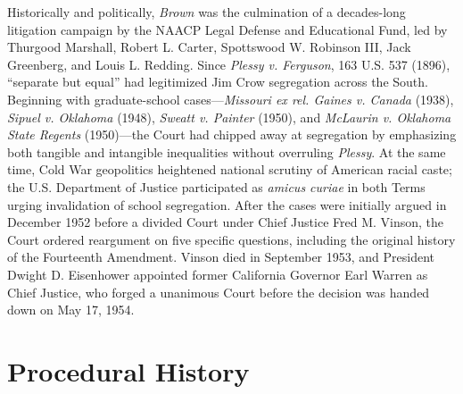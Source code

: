 \documentclass[12pt]{article}
\begin{document}
Historically and politically, \textit{Brown} was the culmination of a decades-long litigation campaign by the NAACP Legal Defense and Educational Fund, led by Thurgood Marshall, Robert L. Carter, Spottswood W. Robinson III, Jack Greenberg, and Louis L. Redding. Since \textit{Plessy v. Ferguson}, 163 U.S. 537 (1896), ``separate but equal'' had legitimized Jim Crow segregation across the South. Beginning with graduate-school cases---\textit{Missouri ex rel. Gaines v. Canada} (1938), \textit{Sipuel v. Oklahoma} (1948), \textit{Sweatt v. Painter} (1950), and \textit{McLaurin v. Oklahoma State Regents} (1950)---the Court had chipped away at segregation by emphasizing both tangible and intangible inequalities without overruling \textit{Plessy}. At the same time, Cold War geopolitics heightened national scrutiny of American racial caste; the U.S. Department of Justice participated as \textit{amicus curiae} in both Terms urging invalidation of school segregation. After the cases were initially argued in December 1952 before a divided Court under Chief Justice Fred M. Vinson, the Court ordered reargument on five specific questions, including the original history of the Fourteenth Amendment. Vinson died in September 1953, and President Dwight D. Eisenhower appointed former California Governor Earl Warren as Chief Justice, who forged a unanimous Court before the decision was handed down on May 17, 1954.

\section{Procedural History}
\end{document}
